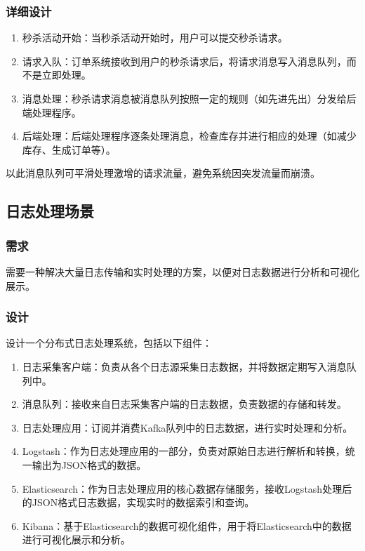 \documentclass[11pt, a4paper, oneside]{ctexbook}
\begin{document}
\subsubsection{详细设计}
\begin{enumerate}
  \item 秒杀活动开始：当秒杀活动开始时，用户可以提交秒杀请求。
  \item 请求入队：订单系统接收到用户的秒杀请求后，将请求消息写入消息队列，而不是立即处理。
  \item 消息处理：秒杀请求消息被消息队列按照一定的规则（如先进先出）分发给后端处理程序。
  \item 后端处理：后端处理程序逐条处理消息，检查库存并进行相应的处理（如减少库存、生成订单等）。
\end{enumerate}

以此消息队列可平滑处理激增的请求流量，避免系统因突发流量而崩溃。

\subsection{日志处理场景}
\subsubsection{需求}
需要一种解决大量日志传输和实时处理的方案，以便对日志数据进行分析和可视化展示。

\subsubsection{设计}
设计一个分布式日志处理系统，包括以下组件：
\begin{enumerate}
  \item 日志采集客户端：负责从各个日志源采集日志数据，并将数据定期写入消息队列中。
  \item 消息队列：接收来自日志采集客户端的日志数据，负责数据的存储和转发。
  \item 日志处理应用：订阅并消费Kafka队列中的日志数据，进行实时处理和分析。
  \item Logstash：作为日志处理应用的一部分，负责对原始日志进行解析和转换，统一输出为JSON格式的数据。
  \item Elasticsearch：作为日志处理应用的核心数据存储服务，接收Logstash处理后的JSON格式日志数据，实现实时的数据索引和查询。
  \item Kibana：基于Elasticsearch的数据可视化组件，用于将Elasticsearch中的数据进行可视化展示和分析。
\end{enumerate}
\end{document}
